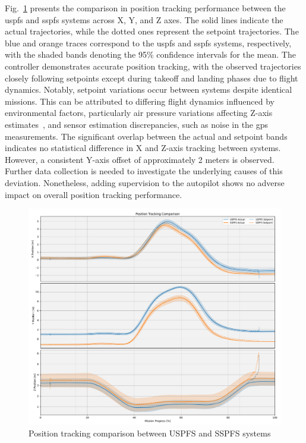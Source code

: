 Fig.~\ref{fig:pos-track-cmp} presents the comparison in position 
tracking performance between the \gls{uspfs} and \gls{sspfs}
systems across X, Y, and Z axes.
%
The solid lines indicate the actual trajectories, while the dotted ones
represent the setpoint trajectories. The blue and orange traces correspond to
the \gls{uspfs} and \gls{sspfs} systems, respectively, with the shaded
bands denoting the 95\% confidence intervals for the mean.
%
The controller demonstrates accurate position tracking, with the observed
trajectories closely following setpoints except during takeoff and landing
phases due to flight dynamics.
%
Notably, setpoint variations occur between systems despite identical
missions. This can be attributed to differing flight dynamics influenced by
environmental factors, particularly air pressure variations affecting Z-axis
estimates~\cite{px4-static-pressure,px4-static-pressure-correc}, and sensor
estimation discrepancies, such as noise in the \gls{gps} measurements.
%
The significant overlap between the actual and setpoint bands indicates no statistical difference in X and Z-axis
tracking between systems. However, a consistent Y-axis offset of approximately 2
meters is observed. Further data collection is needed to investigate the underlying causes of
this deviation. Nonetheless, adding supervision to the autopilot shows no adverse impact on overall position tracking performance.

\begin{figure}[!hbt]
  \centering
  \includegraphics[width=1.0\textwidth]{./img/pdf/pos-track-cmp} 
  \caption{Position tracking comparison between USPFS and SSPFS systems}%
  \label{fig:pos-track-cmp}
\end{figure}

